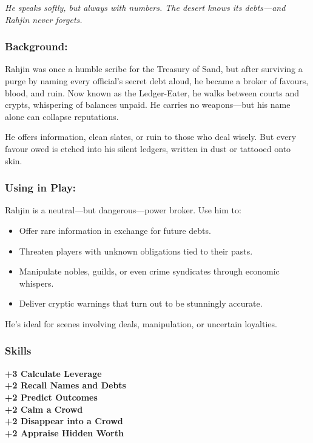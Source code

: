 \emph{He speaks softly, but always with numbers. The desert knows its debts—and Rahjin never forgets.}
\vspace{.5\baselineskip}

\begin{paracol}{3}
    \subsubsection*{Background:}
    Rahjin was once a humble scribe for the Treasury of Sand, but after surviving a purge by naming every official’s secret debt aloud, he became a broker of favours, blood, and ruin. Now known as the Ledger-Eater, he walks between courts and crypts, whispering of balances unpaid. He carries no weapons—but his name alone can collapse reputations.

    He offers information, clean slates, or ruin to those who deal wisely. But every favour owed is etched into his silent ledgers, written in dust or tattooed onto skin.

    \switchcolumn
    \subsubsection*{Using in Play:}
    Rahjin is a neutral—but dangerous—power broker. Use him to:
    \begin{itemize}\raggedright
        \item Offer rare information in exchange for future debts.
        \item Threaten players with unknown obligations tied to their pasts.
        \item Manipulate nobles, guilds, or even crime syndicates through economic whispers.
        \item Deliver cryptic warnings that turn out to be stunningly accurate.
    \end{itemize}

    He’s ideal for scenes involving deals, manipulation, or uncertain loyalties.

    \switchcolumn
    \subsubsection{Skills}
        \noindent\textbf{+3 Calculate Leverage} \\
        \noindent\textbf{+2 Recall Names and Debts} \\
        \noindent\textbf{+2 Predict Outcomes} \\
        \noindent\textbf{+2 Calm a Crowd} \\
        \noindent\textbf{+2 Disappear into a Crowd} \\
        \noindent\textbf{+2 Appraise Hidden Worth}

\end{paracol}
